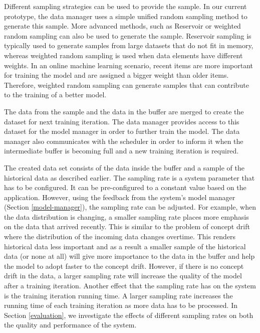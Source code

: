 \documentclass{vldb}
\begin{document}
Different sampling strategies can be used to provide the sample.
In our current prototype, the data manager uses a simple unified random sampling method to generate this sample.
More advanced methods, such as Reservoir \cite{vitter1985random} or weighted random sampling can also be used to generate the sample.
Reservoir sampling is typically used to generate samples from large datasets that do not fit in memory, whereas weighted random sampling is used when data elements have different weights.
In an online machine learning scenario, recent items are more important for training the model and are assigned a bigger weight than older items.
Therefore, weighted random sampling can generate samples that can contribute to the training of a better model.

The data from the sample and the data in the buffer are merged to create the dataset for next training iteration.
The data manager provides access to this dataset for the model manager in order to further train the model.
The data manager also communicates with the scheduler in order to inform it when the intermediate buffer is becoming full and a new training iteration is required. 

The created data set consists of the data inside the buffer and a sample of the historical data as described earlier.
The sampling rate is a system parameter that has to be configured.
It can be pre-configured to a constant value based on the application.
However, using the feedback from the system's model manager (Section \ref{model-manager}), the sampling rate can be adjusted.
For example, when the data distribution is changing, a smaller sampling rate places more emphasis on the data that arrived recently. 
This is similar to the problem of concept drift where the distribution of the incoming data changes overtime.
This renders historical data less important and as a result a smaller sample of the historical data (or none at all) will give more importance to the data in the buffer and help the model to adopt faster to the concept drift.
However, if there is no concept drift in the data, a larger sampling rate will increase the quality of the model after a training iteration.
Another effect that the sampling rate has on the system is the training iteration running time.
A larger sampling rate increases the running time of each training iteration as more data has to be processed.
In Section \ref{evaluation}, we investigate the effects of different sampling rates on both the quality and performance of the system.
\end{document}
